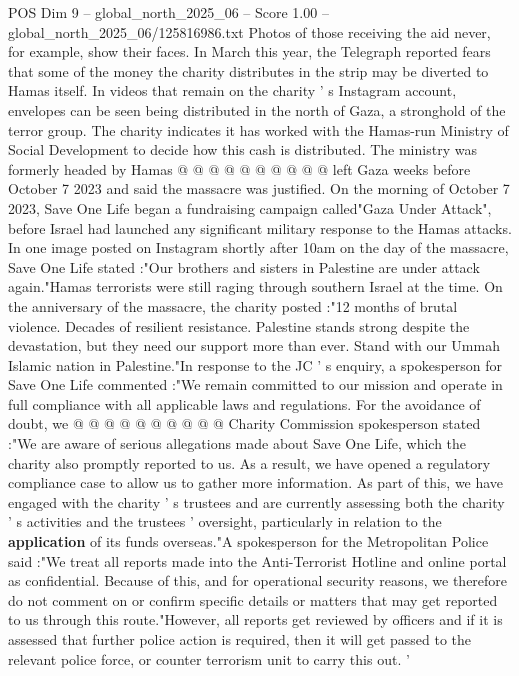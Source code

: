 \begin{textsample}{POS Dim 9 – global\_north\_2025\_06 – Score 1.00 – global\_north\_2025\_06/125816986.txt}
Photos of those receiving the aid never, for example, show their faces.
In March this year, the Telegraph reported fears that some of the money the charity distributes in the strip may be diverted to Hamas itself.
In videos that remain on the charity ' s Instagram account, envelopes can be seen being distributed in the north of Gaza, a stronghold of the terror group.
The charity indicates it has worked with the Hamas-run Ministry of Social Development to decide how this cash is distributed.
The ministry was formerly headed by Hamas @ @ @ @ @ @ @ @ @ @ left Gaza weeks before October 7 2023 and said the massacre was justified.
On the morning of October 7 2023, Save One Life began a fundraising campaign called"Gaza Under Attack", before Israel had launched any significant military response to the Hamas attacks.
In one image posted on Instagram shortly after 10am on the day of the massacre, Save One Life stated :"Our brothers and sisters in Palestine are under attack again."Hamas terrorists were still raging through southern Israel at the time.
On the anniversary of the massacre, the charity posted :"12 months of brutal violence.
Decades of resilient resistance.
Palestine stands strong despite the devastation, but they need our support more than ever.
Stand with our Ummah Islamic nation in Palestine."In response to the JC ' s enquiry, a spokesperson for Save One Life commented :"We remain committed to our mission and operate in full compliance with all applicable laws and regulations.
For the avoidance of doubt, we @ @ @ @ @ @ @ @ @ @ Charity Commission spokesperson stated :"We are aware of serious allegations made about Save One Life, which the charity also promptly reported to us.
As a result, we have opened a regulatory compliance case to allow us to gather more information.
As part of this, we have engaged with the charity ' s trustees and are currently assessing both the charity ' s activities and the trustees ' oversight, particularly in relation to the \textbf{application} of its funds overseas."A spokesperson for the Metropolitan Police said :"We treat all reports made into the Anti-Terrorist Hotline and online portal as confidential.
Because of this, and for operational security reasons, we therefore do not comment on or confirm specific details or matters that may get reported to us through this route."However, all reports get reviewed by officers and if it is assessed that further police action is required, then it will get passed to the relevant police force, or counter terrorism unit to carry this out. '

\end{textsample}
